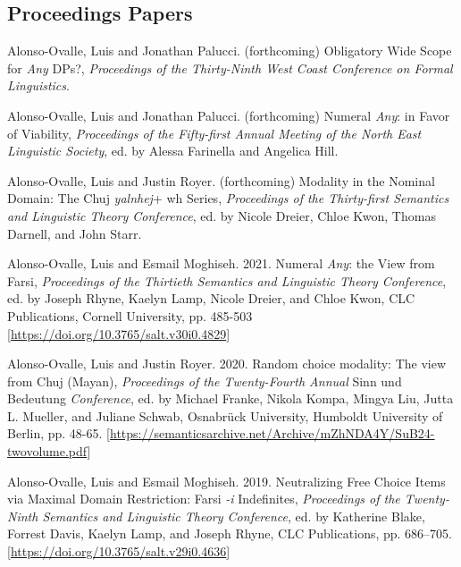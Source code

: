 \documentclass[11pt]{article}
\begin{document}

\subsection*{Proceedings Papers}

Alonso-Ovalle, Luis and Jonathan Palucci. (forthcoming) Obligatory Wide Scope for \textit{Any} DPs?, \textit{Proceedings of the Thirty-Ninth West Coast Conference on Formal Linguistics}.

Alonso-Ovalle, Luis and Jonathan Palucci. (forthcoming) Numeral \textit{Any}: in Favor of Viability, \textit{Proceedings of the Fifty-first Annual Meeting of the North East Linguistic Society}, ed. by Alessa Farinella and Angelica Hill.

Alonso-Ovalle, Luis and Justin Royer. (forthcoming) Modality in the Nominal Domain: The Chuj \textit{yalnhej}+ wh Series, \textit{Proceedings of the Thirty-first Semantics and Linguistic Theory Conference}, ed. by Nicole Dreier, Chloe Kwon, Thomas Darnell, and John Starr.

 Alonso-Ovalle, Luis and Esmail Moghiseh. 2021. Numeral \textit{Any}: the View from Farsi, \textit{Proceedings of the Thirtieth Semantics and Linguistic Theory Conference}, ed. by Joseph Rhyne, Kaelyn Lamp, Nicole Dreier, and Chloe Kwon, CLC Publications, Cornell University, pp. 485-503 {\footnotesize [\href{https://doi.org/10.3765/salt.v30i0.4829}{https://doi.org/10.3765/salt.v30i0.4829}]}

      
    Alonso-Ovalle, Luis and Justin Royer. 2020. Random choice modality: The view from Chuj (Mayan), \textit{Proceedings of the Twenty-Fourth Annual} Sinn und Bedeutung \textit{Conference}, ed. by Michael Franke, Nikola Kompa, Mingya Liu, Jutta L. Mueller, and Juliane Schwab, Osnabr\"{u}ck University, Humboldt University of Berlin, pp. 48-65. 
    {\footnotesize [\href{https://semanticsarchive.net/Archive/mZhNDA4Y/SuB24-twovolume.pdf}{https://semanticsarchive.net/Archive/mZhNDA4Y/SuB24-twovolume.pdf}]}
    
      Alonso-Ovalle, Luis and Esmail Moghiseh. 2019. Neutralizing Free Choice Items via Maximal Domain
Restriction: Farsi \textit{-i} Indefinites, \textit{Proceedings of the Twenty-Ninth Semantics and Linguistic Theory Conference}, ed. by Katherine Blake, Forrest Davis, Kaelyn Lamp, and Joseph Rhyne, CLC Publications, pp. 686–705. {\footnotesize
[\href{https://doi.org/10.3765/salt.v29i0.4636}{https://doi.org/10.3765/salt.v29i0.4636}]}
      
\end{document}

